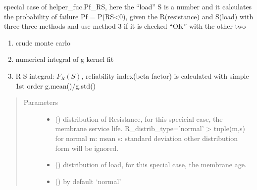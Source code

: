 \documentclass[letterpaper,10pt,english]{sphinxmanual}
\begin{document}
\begin{fulllineitems}
\label{\detokenize{membrane:membrane.Pf_RS_special}}
\sphinxAtStartPar
special case of helper\_fuc.Pf\_RS, here the “load” S is a number and it calculates the probability of failure  Pf = P(R\sphinxhyphen{}S\textless{}0), given the R(resistance) and S(load)
with three three methods and use method 3 if it is checked “OK” with the other two
\begin{enumerate}
%
\item {} 
\sphinxAtStartPar
crude monte carlo

\item {} 
\sphinxAtStartPar
numerical integral of g kernel fit

\item {} 
\sphinxAtStartPar
R S integral: \(F_R(S)\), reliability index(beta factor) is calculated with simple 1st order g.mean()/g.std()

\end{enumerate}
\begin{quote}\begin{description}
\item[{Parameters}] \leavevmode\begin{itemize}
\item {} 
\sphinxAtStartPar
{} () \textendash{} distribution of Resistance, for this specicial case, the membrane service life.
R\_distrib\_type=’normal’ \sphinxhyphen{}\textgreater{} tuple(m,s) for normal m: mean s: standard deviation
other distribution form will be ignored.

\item {} 
\sphinxAtStartPar
{} () \textendash{} distribution of load, for this special case, the membrane age.

\item {} 
\sphinxAtStartPar
{} (\sphinxstyleliteralemphasis{\sphinxupquote{, }}) \textendash{} by default ‘normal’


\end{itemize}
\end{description}
\end{quote}
\end{fulllineitems}
\end{document}
